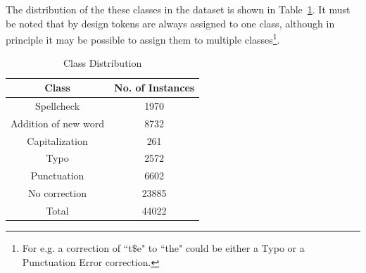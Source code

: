\documentclass[letterpaper]{article}
\begin{document}
\begin{enumerate}
\begin{itemize}
The distribution of the these classes in the dataset is shown in Table~\ref{table: classes}. It must be noted that by design tokens are always assigned to one class, although in principle it may be possible to assign them to multiple classes\footnote{For e.g. a correction of ``t$\$$e" to ``the" could be either a Typo or a Punctuation Error correction.}.

\begin{table}[htdp]
\begin{center}
\begin{tabular}{| c | c |}
\hline
 Class  & No. of Instances \\
\hline
 Spellcheck & 1970 \\
 Addition of new word & 8732 \\
 Capitalization & 261 \\
Typo & 2572 \\
Punctuation & 6602 \\
No correction & 23885 \\
\hline
Total & 44022 \\
\hline
\end{tabular}
\end{center}
\caption{Class Distribution}
\label{table: classes}
\end{table}

\end{itemize}







%



\end{enumerate}
\end{document}
